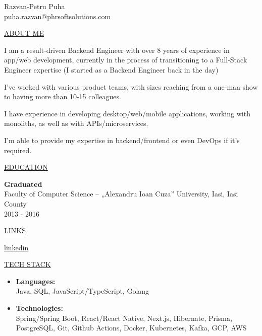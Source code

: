 \documentclass[11pt]{article}
\newcommand{\resumetitle}[3]{
    \AddToShipoutPictureBG{
        \AtPageUpperLeft {
        \raisebox{-0.09\paperheight}{
            \color{black!90}\rule{2\paperwidth}{\paperheight}
            }
        }
    }
    \begin{Center}
        \begingroup
        \titlethin
        \color{black!10}\Huge{#1}
        \titlethick
        \color{black!5}\Huge{#2} \\
        \vspace{2mm}
        \textrm{\color{black!15}\Large{#3}}
        \endgroup
    \end{Center}
    \vspace{7mm}
}
\newcommand{\betteruline}[1]{
    \uline{#1}
}
\newcommand{\sectiontitle}[1]{
    \begingroup
        \titlebold
        \betteruline{\Large\uppercase{#1}  }
        \vspace{1.7mm}
    \endgroup
}
\newcommand{\sectioncontent}[1]{
    \begingroup
        \begin{FlushLeft}
        \vspace{-3mm}
        \sffamily\small#1
        \end{FlushLeft}
    \endgroup
    \vspace{2mm}
}
\newcommand{\spacevv}{
    \vspace{2mm}
}
\begin{document}
    \resumetitle{Razvan-Petru}{Puha} {
        puha.razvan@phrsoftsolutions.com
    }

    \setlength{\columnsep}{7mm}
    \begin{paracol}{2}

    \sectiontitle{about me}
    \sectioncontent{
        I am a result-driven Backend Engineer with over 8 years of experience in app/web development, currently in the process of transitioning to a Full-Stack Engineer expertise (I started as a Backend Engineer back in the day)
        \spacevv
        \spacevv
        
        I've worked with various product teams, with sizes reaching from a one-man show to having more than 10-15 colleagues.
        \spacevv
        \spacevv
        
        I have experience in developing desktop/web/mobile applications, working with monoliths, as well as with APIs/microservices.
        \spacevv
        \spacevv
        
        I'm able to provide my expertise in backend/frontend or even DevOps if it's required.
    }

    \sectiontitle{education}
    \sectioncontent{
        \vspace{2mm}
        \textbf{Graduated} \\
        Faculty of Computer Science – „Alexandru Ioan Cuza” University, Iasi, Iasi County \\
        \textcolor{black!70}{2013 - 2016} \\
    }

    \sectiontitle{links}
    \sectioncontent{
        \faIcon{linkedin-in}\hspace{2.1mm}
        \href{https://www.linkedin.com/in/razvan-petru-puha-5a4582120/}{linkedin} \\
    }

    \sectiontitle{tech stack}
    \sectioncontent{
        \begin{itemize}
            \item \textbf{Languages:} \\
            Java, SQL, JavaScript/TypeScript, Golang
            \item  \textbf{Technologies:} \\
            Spring/Spring Boot, React/React Native, Next.js, Hibernate, Prisma, PostgreSQL, Git, Github Actions, Docker, Kubernetes, Kafka, GCP, AWS
        \end{itemize}  
    }


\end{paracol}
\end{document}
